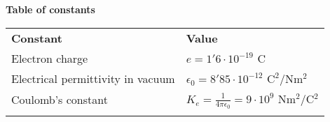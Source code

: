 \documentclass[10pt, a4paper, landscape]{article}
\begin{document}
\newpage
\begin{center}
\vspace{-50mm}
\Large{\vspace{-15mm}\textbf{Table of constants}}
\vspace{-.4mm}

\footnotesize
\begin{longtable}{ll}
    \hline\noalign{\smallskip}
    \textbf{Constant} & \textbf{Value} \\
    \noalign{\smallskip}\hline\noalign{\smallskip}
    Electron charge & $e = 1'6\cdot 10^{-19}$ C \\
    Electrical permittivity in vacuum & $\epsilon_0 = 8'85\cdot 10^{-12} \textrm{ C}^2$/N$\textrm{m}^2$ \\
    Coulomb's constant & $K_e = \frac{1}{4\pi\epsilon_0} = 9\cdot 10^9$ Nm$^2$/C$^2$ \\
    \noalign{\smallskip}\hline\noalign{\smallskip}
\end{longtable}

\end{center}
\end{document}

